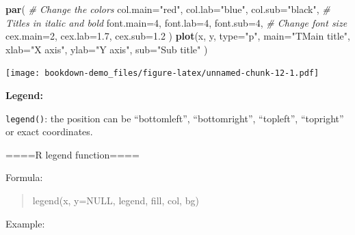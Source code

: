 \documentclass[]{book}
\newenvironment{Shaded}{\begin{snugshade}}{\end{snugshade}}
\newcommand{\KeywordTok}[1]{\textcolor[rgb]{0.13,0.29,0.53}{\textbf{#1}}}
\newcommand{\DataTypeTok}[1]{\textcolor[rgb]{0.13,0.29,0.53}{#1}}
\newcommand{\DecValTok}[1]{\textcolor[rgb]{0.00,0.00,0.81}{#1}}
\newcommand{\FloatTok}[1]{\textcolor[rgb]{0.00,0.00,0.81}{#1}}
\newcommand{\StringTok}[1]{\textcolor[rgb]{0.31,0.60,0.02}{#1}}
\newcommand{\CommentTok}[1]{\textcolor[rgb]{0.56,0.35,0.01}{\textit{#1}}}
\newcommand{\OperatorTok}[1]{\textcolor[rgb]{0.81,0.36,0.00}{\textbf{#1}}}
\newcommand{\NormalTok}[1]{#1}
\begin{document}
\begin{Shaded}
\begin{Highlighting}[]
\KeywordTok{par}\NormalTok{(}
  \CommentTok{# Change the colors}
  \DataTypeTok{col.main=}\StringTok{"red"}\NormalTok{, }\DataTypeTok{col.lab=}\StringTok{"blue"}\NormalTok{, }\DataTypeTok{col.sub=}\StringTok{"black"}\NormalTok{,}
  \CommentTok{# Titles in italic and bold}
  \DataTypeTok{font.main=}\DecValTok{4}\NormalTok{, }\DataTypeTok{font.lab=}\DecValTok{4}\NormalTok{, }\DataTypeTok{font.sub=}\DecValTok{4}\NormalTok{,}
  \CommentTok{# Change font size}
  \DataTypeTok{cex.main=}\DecValTok{2}\NormalTok{, }\DataTypeTok{cex.lab=}\FloatTok{1.7}\NormalTok{, }\DataTypeTok{cex.sub=}\FloatTok{1.2}
\NormalTok{  )}
\KeywordTok{plot}\NormalTok{(x, y, }\DataTypeTok{type=}\StringTok{"p"}\NormalTok{,}
     \DataTypeTok{main=}\StringTok{"TMain title"}\NormalTok{,}
        \DataTypeTok{xlab=}\StringTok{"X axis"}\NormalTok{,}
        \DataTypeTok{ylab=}\StringTok{"Y axis"}\NormalTok{,}
        \DataTypeTok{sub=}\StringTok{"Sub title"}
\NormalTok{     )}
\end{Highlighting}
\end{Shaded}

\texttt{[image: bookdown-demo\_files/figure-latex/unnamed-chunk-12-1.pdf]}

\textbf{Legend: }

\texttt{legend()}: the position can be ``bottomleft'', ``bottomright'',
``topleft'', ``topright'' or exact coordinates.

====R legend function====

Formula:

\begin{quote}
legend(x, y=NULL, legend, fill, col, bg)
\end{quote}

Example:

\begin{Shaded}
\end{Shaded}
\end{document}
